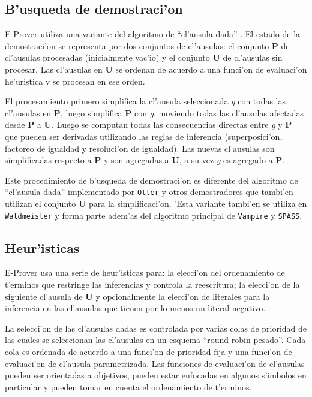 \subsection{B'usqueda de demostraci'on}

E-Prover utiliza una variante del algoritmo de ``cl'ausula dada'' \cite{dk97}. El estado de la demostraci'on se representa por dos conjuntos de cl'ausulas: el conjunto \textbf{P} de cl'ausulas procesadas (inicialmente vac'io) y el conjunto \textbf{U} de cl'ausulas sin procesar. Las cl'ausulas en \textbf{U} se ordenan de acuerdo a una funci'on de evaluaci'on he'uristica y se procesan en ese orden.

El procesamiento primero simplifica la cl'ausula seleccionada \textit{g} con todas las cl'ausulas en \textbf{P}, luego simplifica \textbf{P} con \textit{g}, moviendo todas las cl'ausulas afectadas desde \textbf{P} a \textbf{U}. Luego se computan todas las consecuencias directas entre \textit{g} y \textbf{P} que pueden ser derivadas utilizando las reglas de inferencia (superposici'on, factoreo de igualdad y resoluci'on de igualdad). Las nuevas cl'ausulas son simplificadas respecto a \textbf{P} y son agregadas a \textbf{U}, a su vez \textit{g} es agregado a \textbf{P}.

Este procedimiento de b'usqueda de demostraci'on es diferente del algoritmo de ``cl'ausula dada'' implementado por \texttt{Otter}\cite{otter} y otros demostradores que tambi'en utilizan el conjunto \textbf{U} para la simplificaci'on. 'Esta variante tambi'en se utiliza en \texttt{Waldmeister}\cite{BH96} y forma parte adem'as del algoritmo principal de \texttt{Vampire} \cite{vampire} y \texttt{SPASS}\cite{spass}.

\subsection{Heur'isticas}

E-Prover usa una serie de heur'isticas para: la elecci'on del ordenamiento de t'erminos que restringe las inferencias y controla la reescritura; la elecci'on de la siguiente cl'ausula de \textbf{U} y opcionalmente la elecci'on de literales para la inferencia en las cl'ausulas que tienen por lo menos un literal negativo.

La selecci'on de las cl'ausulas dadas es controlada por varias colas de prioridad de las cuales se seleccionan las cl'ausulas en un esquema ``round robin pesado''. Cada cola es ordenada de acuerdo a una funci'on de prioridad fija y una funci'on de evaluaci'on de cl'ausula parametrizada. Las funciones de evaluaci'on de cl'ausulas pueden ser orientadas a objetivos, pueden estar enfocadas en algunos s'imbolos en particular y pueden tomar en cuenta el ordenamiento de t'erminos. 


